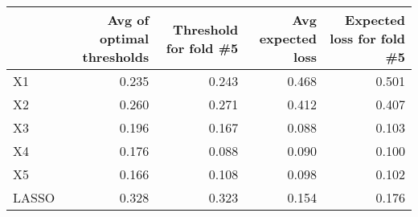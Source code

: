 
\begin{tabular}{lrrrr}
\toprule
  & Avg of optimal thresholds & Threshold for fold \#5 & Avg expected loss & Expected loss for fold \#5\\
\midrule
X1 & 0.235 & 0.243 & 0.468 & 0.501\\
X2 & 0.260 & 0.271 & 0.412 & 0.407\\
X3 & 0.196 & 0.167 & 0.088 & 0.103\\
X4 & 0.176 & 0.088 & 0.090 & 0.100\\
X5 & 0.166 & 0.108 & 0.098 & 0.102\\
LASSO & 0.328 & 0.323 & 0.154 & 0.176\\
\bottomrule
\end{tabular}